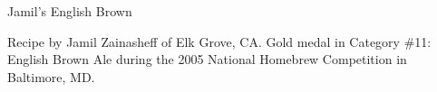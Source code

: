 \documentclass[parskip=half,fontsize=9pt,oneside]{scrbook}
\begin{document}
\mainmatter


\begin{recipe}{Jamil's English Brown}

\begin{aboutblock}
Recipe by Jamil Zainasheff of Elk Grove, CA. Gold medal in Category \#11: English
Brown Ale during the 2005 National Homebrew Competition in Baltimore, MD.
\sourceaha
\end{aboutblock}


\begin{methodandtiming}

\begin{mashsteps}
\end{mashsteps}

\end{methodandtiming}

\recipebreak

\begin{ingredientsblock}

\begin{malts}
\end{malts}

\begin{hops}
\end{hops}


\end{ingredientsblock}

\end{recipe}


\end{document}
